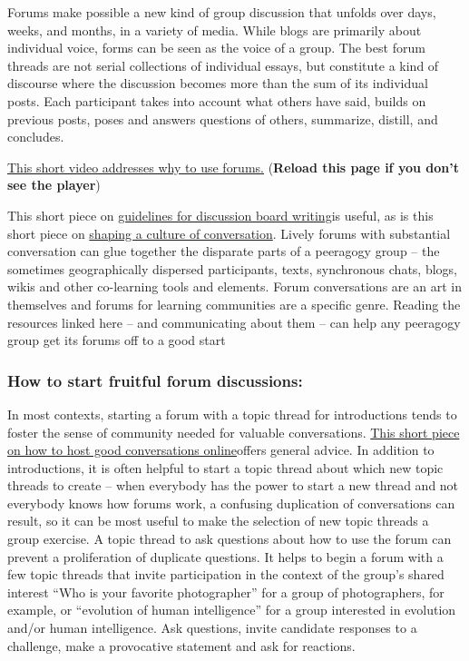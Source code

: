 Forums make possible a new kind of group discussion that unfolds over
days, weeks, and months, in a variety of media. While blogs are
primarily about individual voice, forms can be seen as the voice of a
group. The best forum threads are not serial collections of individual
essays, but constitute a kind of discourse where the discussion becomes
more than the sum of its individual posts. Each participant takes into
account what others have said, builds on previous posts, poses and
answers questions of others, summarize, distill, and concludes.

\href{http://blip.tv/file/1123048}{This short video addresses why to use
forums}\href{http://socialmediaclassroom.com/community/page/how}{.}
(\textbf{Reload this page if you don't see the player})

This short piece on
\href{http://www.lehigh.edu/~indiscus/doc\_guidelines.html}{guidelines
for discussion board writing}is useful, as is this short piece on
\href{http://academiccommons.org/commons/essay/shaping-culture-conversation}{shaping
a culture of conversation}. Lively forums with substantial conversation
can glue together the disparate parts of a peeragogy group -- the
sometimes geographically dispersed participants, texts, synchronous
chats, blogs, wikis and other co-learning tools and elements. Forum
conversations are an art in themselves and forums for learning
communities are a specific genre. Reading the resources linked here --
and communicating about them -- can help any peeragogy group get its
forums off to a good start

\subsubsection{How to start fruitful forum discussions:}

In most contexts, starting a forum with a topic thread for introductions
tends to foster the sense of community needed for valuable
conversations.
\href{http://www.rheingold.com/texts/artonlinehost.html}{This short
piece on how to host good conversations online}offers general advice. In
addition to introductions, it is often helpful to start a topic thread
about which new topic threads to create -- when everybody has the power
to start a new thread and not everybody knows how forums work, a
confusing duplication of conversations can result, so it can be most
useful to make the selection of new topic threads a group exercise. A
topic thread to ask questions about how to use the forum can prevent a
proliferation of duplicate questions. It helps to begin a forum with a
few topic threads that invite participation in the context of the
group's shared interest ``Who is your favorite photographer'' for a
group of photographers, for example, or ``evolution of human
intelligence'' for a group interested in evolution and/or human
intelligence. Ask questions, invite candidate responses to a challenge,
make a provocative statement and ask for reactions.

